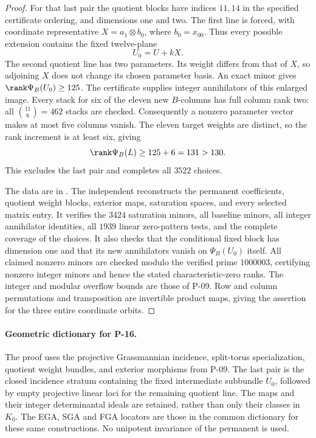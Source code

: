\begin{proof}
For that last pair the quotient blocks have indices $11,14$ in the
specified certificate ordering, and dimensions one and two. The first
line is forced, with coordinate representative
$X=a_1\otimes b_0$, where $b_0=x_{00}$. Thus every possible extension
contains the fixed twelve-plane
\[
 U_0=U+kX.
\]
The second quotient line has two parameters. Its weight differs from
that of $X$, so adjoining $X$ does not change its chosen parameter basis.
An exact minor gives $\rank\Psi_B(U_0)\ge125$. The certificate supplies
integer annihilators of this enlarged image. Every stack for six of
the eleven new $B$-columns has full column rank two: all
$\binom{11}{6}=462$ stacks are checked. Consequently a nonzero parameter
vector makes at most five columns vanish. The eleven target weights
are distinct, so the rank increment is at least six, giving
\[
 \rank\Psi_B(L)\ge125+6=131>130.
\]
This excludes the last pair and completes all $3522$ choices.

The data are in . The independent
 reconstructs the permanent
coefficients, quotient weight blocks, exterior maps, saturation spaces,
and every selected matrix entry. It verifies the $3424$ saturation
minors, all baseline minors, all integer annihilator identities, all
$1939$ linear zero-pattern tests, and the complete coverage of the choices.
It also checks that the conditional fixed block has dimension one and
that its new annihilators vanish on $\Psi_B(U_0)$ itself. All claimed
nonzero minors are checked modulo the verified prime $1000003$,
certifying nonzero integer minors and hence the stated characteristic-zero
ranks. The integer and modular overflow bounds are those of P-09.
Row and column permutations and transposition are invertible product
maps, giving the assertion for the three entire coordinate orbits.
\end{proof}

\paragraph{Geometric dictionary for P-16.}
The proof uses the projective Grassmannian incidence, split-torus
specialization, quotient weight bundles, and exterior morphisms from
P-09. The last pair is the closed incidence stratum containing the
fixed intermediate subbundle $U_0$, followed by empty projective linear
loci for the remaining quotient line. The maps and their integer
determinantal ideals are retained, rather than only their classes in
$K_0$. The EGA, SGA and FGA locators are those in the common dictionary
for these same constructions. No unipotent invariance of the permanent
is used.
